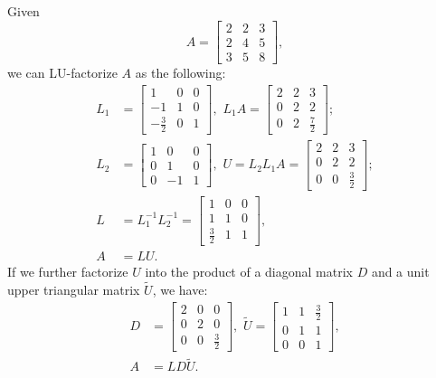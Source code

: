 \documentclass[11pt]{article}
\begin{document}
\subsection{}
Given $$A = \begin{bmatrix} 2 & 2 & 3 \\ 2 & 4 & 5 \\ 3 & 5 & 8\end{bmatrix}, $$
we can LU-factorize $A$ as the following:
\begin{equation}\begin{split} 
L_1 &= \begin{bmatrix} 1 & 0& 0\\ -1 & 1 &0 \\ -\frac32 & 0 & 1\end{bmatrix},\,\,
L_1A = \begin{bmatrix}2 & 2 & 3 \\ 0 & 2 & 2\\ 0 & 2 & \frac72 \end{bmatrix};\\
L_2 &= \begin{bmatrix} 1 & 0 & 0 \\ 0 & 1 & 0\\ 0 & -1 &1 \end{bmatrix},\,\,
U = L_2L_1A = \begin{bmatrix} 2 & 2 & 3 \\ 0 & 2 & 2 \\ 0 & 0 & \frac32 \end{bmatrix};\\
L &= L_1^{-1}L_2^{-1} = \begin{bmatrix}1 & 0 & 0 \\ 1 & 1 & 0 \\ \frac32 & 1 & 1 \end{bmatrix},\\
A &= LU.
\end{split}\nonumber\end{equation} 
If we further factorize $U$ into the product of a diagonal matrix $D$ and a unit upper triangular matrix $\tilde U$, we have:
\begin{equation}\begin{split} 
D &= \begin{bmatrix} 2 & 0 & 0 \\ 0 & 2 & 0 \\ 0 & 0 & \frac32\end{bmatrix}, \,\, 
\tilde U = \begin{bmatrix} 1 & 1 & \frac32\\ 0 & 1 & 1 \\ 0 & 0 & 1\end{bmatrix},\\
A &= L D \tilde U.  
\end{split}\nonumber\end{equation} 
\end{document}
